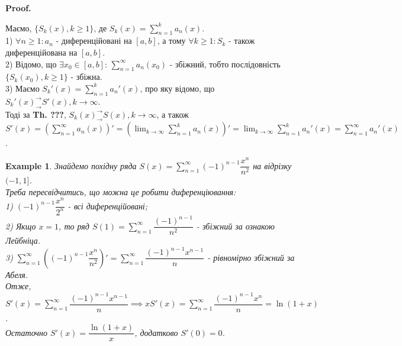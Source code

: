 \documentclass[a4paper, 10pt]{article}
\makeatletter
\def\huge{\displaystyle}
\def\qed{$\blacksquare$}
\theoremstyle{theoremdd}
\theoremstyle{theoremdd}
\theoremstyle{theoremdd}
\theoremstyle{theoremdd}
\theoremstyle{theoremdd}
\newtheorem{example}[theorem]{Example}
\theoremstyle{theoremdd}
\theoremstyle{theoremdd}
\theoremstyle{theoremdd}
\theoremstyle{theoremdd}
\renewenvironment{proof}[1][Proof.\\]{\par
\pushQED{\hfill \qed}%
\normalfont \topsep6\p@\@plus6\p@\relax
\trivlist
\item\relax
{\bfseries
#1\@addpunct{.}}\hspace\labelsep\ignorespaces
}{%
\popQED\endtrivlist\@endpefalse
}
\makeatother
\begin{document}
\begin{proof}
Маємо, $\{S_k(x), k \geq 1\}$, де $S_k(x) = \huge\sum_{n=1}^k a_n(x)$.\\
1) $\forall n \geq 1: a_n$ - диференційовані на $[a,b]$, а тому $\forall k \geq 1: S_k$ - також диференційована на $[a,b]$.\\
2) Відомо, що $\exists x_0 \in [a,b]$: $\huge\sum_{n=1}^\infty a_n(x_0)$ - збіжний, тобто послідовність $\{S_k(x_0), k \geq 1\}$ - збіжна.\\
3) Маємо $S_k'(x) = \huge\sum_{n=1}^k a_n'(x)$, про яку відомо, що $S_k'(x)^\rightarrow_\rightarrow S'(x), k \to \infty$.\\
Тоді за \textbf{Th. ???}, $S_k(x)^\rightarrow_\rightarrow S(x), k \to \infty$, а також\\
$S'(x) = \huge\left(\sum_{n=1}^\infty a_n(x) \right)' = \left( \lim_{k \to \infty} \sum_{n=1}^k a_n(x) \right)' = \lim_{k \to \infty} \sum_{n=1}^k a_n'(x) = \sum_{n=1}^\infty a_n'(x)$.
\end{proof}

\begin{example}
Знайдемо похідну ряда $S(x) = \huge\sum_{n=1}^\infty (-1)^{n-1}\dfrac{x^n}{n^2}$ на відрізку $(-1,1]$.\\
Треба пересвідчитись, що можна це робити диференціювання:\\
1) $(-1)^{n-1}\dfrac{x^n}{2^n}$ - всі диференційовані;\\
2) Якщо $x = 1$, то ряд $S(1) = \huge\sum_{n=1}^\infty \dfrac{(-1)^{n-1}}{n^2}$ - збіжний за ознакою Лейбніца.\\
3) $\huge\sum_{n=1}^\infty \left( (-1)^{n-1}\dfrac{x^n}{n^2} \right)' = \huge\sum_{n=1}^\infty \dfrac{(-1)^{n-1}x^{n-1}}{n}$ - рівномірно збіжний за Абеля.\\
Отже, $S'(x) = \huge\sum_{n=1}^\infty \dfrac{(-1)^{n-1} x^{n-1}}{n} \implies x S'(x) = \sum_{n=1}^\infty \dfrac{(-1)^{n-1}x^n}{n} = \ln (1+x)$.\\
Остаточно $S'(x) = \dfrac{\ln(1+x)}{x}$, додатково $S'(0) = 0$.
\end{example}
\end{document}
